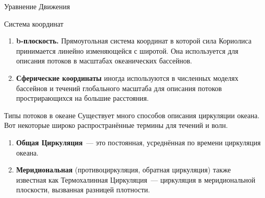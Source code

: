 \begin{chapter}{Уравнение Движения}
\begin{section}{Система координат}
\begin{enumerate}
\item
\textbf{b-плоскость.} Прямоугольная система координат в которой сила
Кориолиса принимается линейно изменяющейся с широтой. Она используется
для описания потоков в масштабах океанических бассейнов.
%

\item
\textbf{Сферические координаты} 
иногда используются в численных моделях бассейнов и течений глобального 
масштаба для описания потоков прострирающихся на большие расстояния.
%
\end{enumerate}
\end{section}

\begin{section}{Типы потоков в океане}
Существует много способов описания циркуляции океана. Вот некоторые
широко распространённые термины для течений и волн.
%

\begin{enumerate}
\item
\textbf{Общая Циркуляция}~--- это постоянная, усреднённая по времени
циркуляция океана.
%

\item
\textbf{Меридиональная} (противоциркуляция, обратная циркуляция) также
известная как Термохалинная Циркуляция~--- циркуляция в меридиональной
плоскости, вызванная разницей плотности.
%


\end{enumerate}
\end{section}
\end{chapter}
